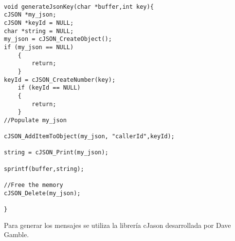 \begin{lstlisting}[label=cod: generación de mensaje,caption= Función que genera el payload.]

void generateJsonKey(char *buffer,int key){
cJSON *my_json;
cJSON *keyId = NULL;
char *string = NULL;    
my_json = cJSON_CreateObject();
if (my_json == NULL)
    {
        return;
    }
keyId = cJSON_CreateNumber(key);
    if (keyId == NULL)
    {
        return;
    }    
//Populate my_json

cJSON_AddItemToObject(my_json, "callerId",keyId);

string = cJSON_Print(my_json);

sprintf(buffer,string);

//Free the memory
cJSON_Delete(my_json);

}

\end{lstlisting}

Para generar los mensajes se utiliza la librería cJason desarrollada por Dave Gamble.